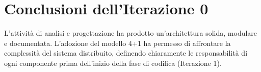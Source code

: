 \section{Conclusioni dell'Iterazione 0}

L'attività di analisi e progettazione ha prodotto un'architettura solida, modulare e documentata. L'adozione del modello 4+1 ha permesso di affrontare la complessità del sistema distribuito, definendo chiaramente le responsabilità di ogni componente prima dell'inizio della fase di codifica (Iterazione 1).